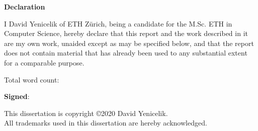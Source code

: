 \newpage
{\Huge \bf Declaration}

\vspace{24pt} 

I David Yenicelik of ETH Zürich, being a candidate for the M.Sc. ETH in
Computer Science, hereby declare that this report and the
work described in it are my own work, unaided except as may be
specified below, and that the report does not contain material that
has already been used to any substantial extent for a comparable
purpose.

\vspace{24pt}
Total word count: \wordcount

\vspace{60pt}
\textbf{Signed}: 

\vfill

This dissertation is copyright \copyright 2020 David Yenicelik. 
\\
All trademarks used in this dissertation are hereby acknowledged.



\newpage
\vspace*{\fill}
